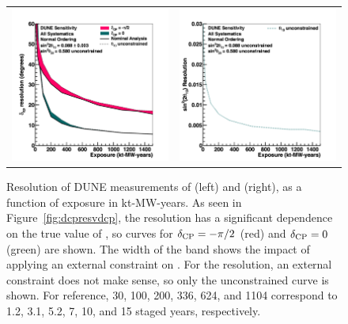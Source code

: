 \begin{figure}[h!]
    \centering
    \begin{tabular}{cc}
		\includegraphics[width=0.475\linewidth]{graphics/dcpres_exp_varyconstr_nh_2019_v4.png} &
		\includegraphics[width=0.475\linewidth]{graphics/th13res_exp_varyconstr_nh_2019_v4.png} 
	\end{tabular}  
	\caption[Resolution of DUNE measurements of \deltacp and , as a function of exposure]{Resolution of DUNE measurements of \deltacp (left) and  (right), as a function of exposure in kt-MW-years. As seen in Figure~\ref{fig:dcpresvdcp}, the \deltacp resolution has a significant dependence on the true value of \deltacp, so curves for $\delta_{\rm CP}=-\pi/2$ (red) and $\delta_{\rm CP}=0$ (green) are shown. The width of the band shows the impact of applying an external constraint on . For the  resolution, an external constraint does not make sense, so only the unconstrained curve is shown.
For reference, 30, 100, 200, 336, 624, and \SI{1104}{\ktMWyr} correspond to 1.2, 3.1, 5.2, 7, 10, and 15 staged years, respectively.
}
    \label{fig:appres_exp}
\end{figure}

